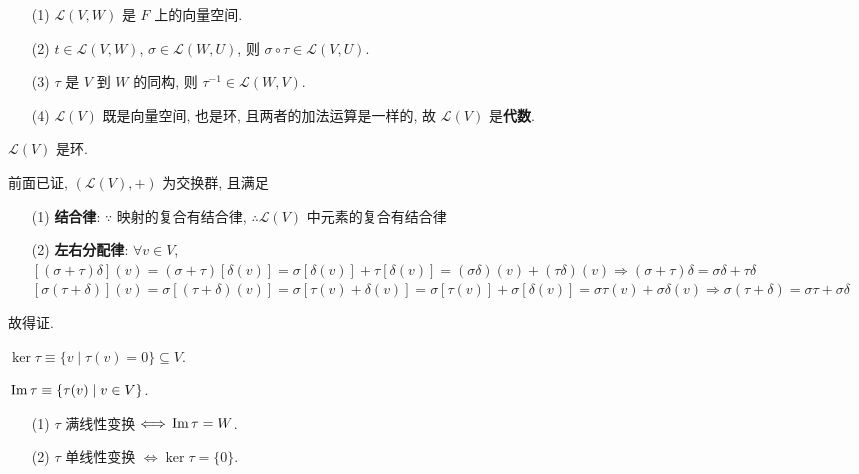 \documentclass{note}
\begin{document}
\begin{thm}[(课本定理 2.1)]
    \begin{itemize}
        \item[(1)] $\mathcal{L}(V,W)$ 是 $F$ 上的向量空间.
        \item[(2)] $t\in\mathcal{L}(V,W)$, $\sigma\in\mathcal{L}(W,U)$, 则 $\sigma\circ\tau\in\mathcal{L}(V,U)$.
        \item[(3)] $\tau$ 是 $V$ 到 $W$ 的同构, 则 $\tau^{-1}\in\mathcal{L}(W,V)$.
        \item[(4)] $\mathcal{L}(V)$ 既是向量空间, 也是环, 且两者的加法运算是一样的, 故 $\mathcal{L}(V)$ 是\textbf{代数}.
    \end{itemize}
\end{thm}

$\mathcal{L}(V)$ 是环.
\begin{pf}
    前面已证, $(\mathcal{L}(V),+)$ 为交换群, 且满足
    \begin{itemize}
        \item[(1)] \textbf{结合律}: $\because$ 映射的复合有结合律, $\therefore\mathcal{L}(V)$ 中元素的复合有结合律
        \item[(2)] \textbf{左右分配律}: $\forall v\in V$, $[(\sigma+\tau)\delta](v)=(\sigma+\tau)[\delta(v)]=\sigma[\delta(v)]+\tau[\delta(v)]=(\sigma\delta)(v)+(\tau\delta)(v)\Longrightarrow(\sigma+\tau)\delta=\sigma\delta+\tau\delta$\\
        $[\sigma(\tau+\delta)](v)=\sigma[(\tau+\delta)(v)]=\sigma[\tau(v)+\delta(v)]=\sigma[\tau(v)]+\sigma[\delta(v)]=\sigma\tau(v)+\sigma\delta(v)\Longrightarrow\sigma(\tau+\delta)=\sigma\tau+\sigma\delta$
    \end{itemize}
    故得证.
\end{pf}

\begin{df}[核空间]
    $\ker\tau\equiv\{v\mid\tau(v)=0\}\subseteq V$.
\end{df}

\begin{df}[像空间]
    $\,\mathrm{Im}\,\tau\equiv\{\tau(v)\mid v\in V\}$.
\end{df}

\begin{thm}[(课本定理 2.3)]
    \begin{itemize}
        \item[(1)] $\tau$ 满线性变换 $\Longleftrightarrow\,\mathrm{Im}\,\tau=W$.
        \item[(2)] $\tau$ 单线性变换 $\Longleftrightarrow\ker\tau=\{0\}$.
    \end{itemize}
\end{thm}
\end{document}
